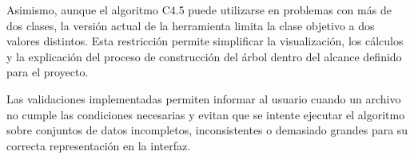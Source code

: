 Asimismo, aunque el algoritmo C4.5 puede utilizarse en problemas con más de dos clases, la versión actual de la herramienta limita la clase objetivo a dos valores distintos. Esta restricción permite simplificar la visualización, los cálculos y la explicación del proceso de construcción del árbol dentro del alcance definido para el proyecto.

Las validaciones implementadas permiten informar al usuario cuando un archivo no cumple las condiciones necesarias y evitan que se intente ejecutar el algoritmo sobre conjuntos de datos incompletos, inconsistentes o demasiado grandes para su correcta representación en la interfaz.


